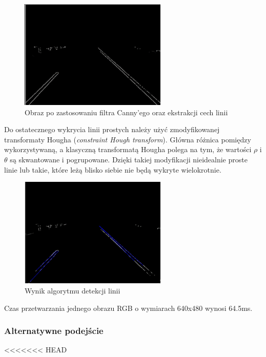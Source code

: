 \begin{figure}
  \centering
  \includegraphics[width=7cm]{img/canny.png}
  \caption{Obraz po zastosowaniu filtra Canny'ego oraz ekstrakcji cech linii\cite{T3}}
  \label{fig:canny}
\end{figure}

Do ostatecznego wykrycia linii prostych należy użyć zmodyfikowanej transformaty Hougha (\textit{constraint Hough transform}). 
Główna różnica pomiędzy wykorzystywaną, a klasyczną transformatą Hougha polega na tym, że wartości $\rho$ i $\theta$ są skwantowane i pogrupowane. 
Dzięki takiej modyfikacji nieidealnie proste linie lub takie, które leżą blisko siebie nie będą wykryte wielokrotnie. 

\begin{figure}
  \centering
  \includegraphics[width=7cm]{img/prehough.png}
  \caption{Wynik algorytmu detekcji linii\cite{T3}}
  \label{fig:result}
\end{figure}

Czas przetwarzania jednego obrazu RGB o wymiarach 640x480 wynosi 64.5ms.

\subsubsection{Alternatywne podejście}
<<<<<<< HEAD

